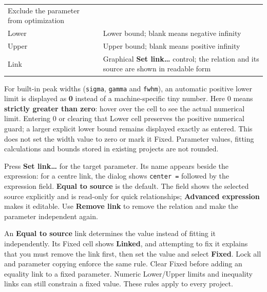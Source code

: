 \documentclass[
  10pt,
  a4paper,
  oneside]{scrreprt}
\begin{document}
\begin{longtable}[]{@{}ll@{}}
\begin{minipage}[t]{0.47\columnwidth}
Exclude the parameter from optimization\strut
\end{minipage}\tabularnewline
\begin{minipage}[t]{0.47\columnwidth}\raggedright
Lower\strut
\end{minipage} & \begin{minipage}[t]{0.47\columnwidth}\raggedright
Lower bound; blank means negative infinity\strut
\end{minipage}\tabularnewline
\begin{minipage}[t]{0.47\columnwidth}\raggedright
Upper\strut
\end{minipage} & \begin{minipage}[t]{0.47\columnwidth}\raggedright
Upper bound; blank means positive infinity\strut
\end{minipage}\tabularnewline
\begin{minipage}[t]{0.47\columnwidth}\raggedright
Link\strut
\end{minipage} & \begin{minipage}[t]{0.47\columnwidth}\raggedright
Graphical \textbf{Set link\ldots{}} control; the relation and its source
are shown in readable form\strut
\end{minipage}\tabularnewline
\bottomrule
\end{longtable}

For built-in peak widths (\texttt{sigma}, \texttt{gamma} and
\texttt{fwhm}), an automatic positive lower limit is displayed as
\textbf{0} instead of a machine-specific tiny number. Here 0 means
\textbf{strictly greater than zero}: hover over the cell to see the
actual numerical limit. Entering 0 or clearing that Lower cell preserves
the positive numerical guard; a larger explicit lower bound remains
displayed exactly as entered. This does not set the width value to zero
or mark it Fixed. Parameter values, fitting calculations and bounds
stored in existing projects are not rounded.

Press \textbf{Set link\ldots{}} for the target parameter. Its name
appears beside the expression: for a centre link, the dialog shows
\texttt{center\ =} followed by the expression field. \textbf{Equal to
source} is the default. The field shows the selected source explicitly
and is read-only for quick relationships; \textbf{Advanced expression}
makes it editable. Use \textbf{Remove link} to remove the relation and
make the parameter independent again.

An \textbf{Equal to source} link determines the value instead of fitting
it independently. Its Fixed cell shows \textbf{Linked}, and attempting
to fix it explains that you must remove the link first, then set the
value and select \textbf{Fixed}. Lock all and parameter copying enforce
the same rule. Clear Fixed before adding an equality link to a fixed
parameter. Numeric Lower/Upper limits and inequality links can still
constrain a fixed value. These rules apply to every project.
\end{document}
